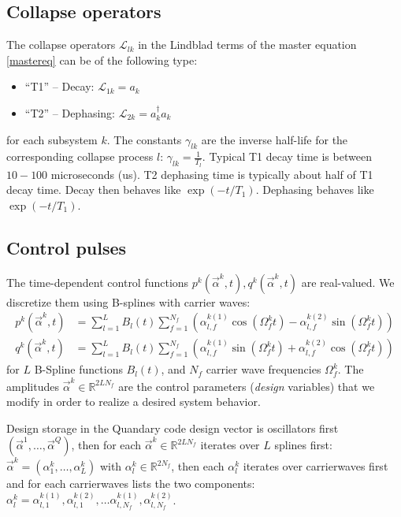 \documentclass[letterpaper]{article}
\newcommand{\Ell}{\mathcal{L}}
\newcommand{\R}{\mathds{R}}
\begin{document}
\subsection{Collapse operators}
The collapse operators $\Ell_{lk}$ in the Lindblad terms of the master equation
\eqref{mastereq} can be of the following type:
\begin{itemize}
  \item ``T1'' -- Decay: $\Ell_{1k} = a_k$
  \item ``T2'' -- Dephasing: $\Ell_{2k} = a_k^{\dagger}a_k$
\end{itemize}
for each subsystem $k$. The constants $\gamma_{lk}$ are the inverse half-life
for the corresponding collapse process $l$: $\gamma_{lk} = {\frac{1}{T_l}}$.
Typical T1 decay time is between $10-100$ microseconds (us). T2 dephasing time
is typically about half of T1 decay time. Decay then behaves like
$\exp(-t/{T_1})$. Dephasing behaves like $\exp(- t / T_1)$.

\subsection{Control pulses}
The time-dependent control functions $p^k(\vec{\alpha}^k,t),
q^k(\vec{\alpha}^k,t)$ are real-valued. We discretize them using B-splines with
carrier waves:
\begin{align}
  p^k(\vec{\alpha}^k,t) &= \sum_{l=1}^L B_l(t) \sum_{f=1}^{N_f} \left(\alpha^{k
  (1)}_{l,f} \cos(\Omega_f^k t) - \alpha^{k (2)}_{l,f} \sin(\Omega_f^k t)
  \right) \\
  q^k(\vec{\alpha}^k,t) &= \sum_{l=1}^L B_l(t) \sum_{f=1}^{N_f} \left( \alpha^{k
  (1)}_{l,f} \sin(\Omega_f^k t) + \alpha^{k (2)}_{l,f} \cos(\Omega_f^k t)
  \right)
\end{align}
for $L$ B-Spline functions $B_l(t)$, and $N_f$ carrier wave frequencies
$\Omega_f^k$. The amplitudes $\vec{\alpha}^k \in \R^{2LN_f}$ are the control
parameters (\textit{design} variables) that we modify in order to realize a
desired system behavior. 

Design storage in the Quandary code design vector is oscillators first
$(\vec{\alpha}^1, \dots, \vec{\alpha}^Q)$, then for each $\vec{\alpha}^k \in
\R^{2LN_f}$ iterates over $L$ splines first: $\vec{\alpha}^k =
(\alpha^k_1,\dots, \alpha^k_{L})$ with $\alpha^k_l \in \R^{2N_f}$, then each
$\alpha^k_l$ iterates over carrierwaves first and for each carrierwaves lists
the two components: $\alpha^k_l = \alpha^{k(1)}_{l,1}, \alpha^{k(2)}_{l,1},
\dots \alpha^{k(1)}_{l,N_f}, \alpha^{k(2)}_{l,N_f}$.
\end{document}
